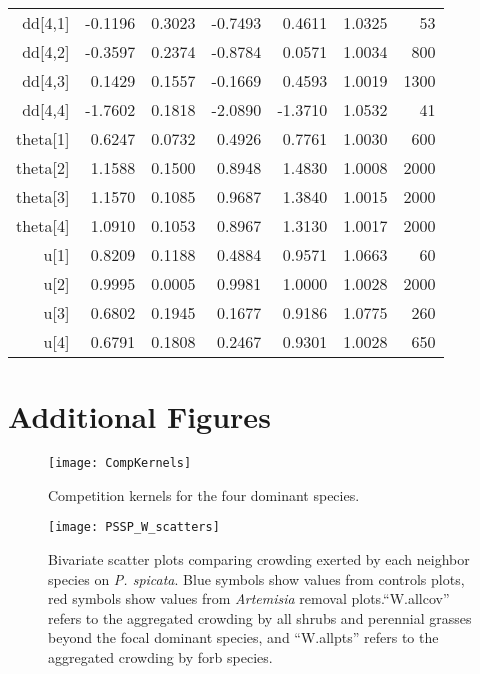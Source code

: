 \documentclass[11pt]{article}
\begin{document}
\begin{table}[ht]
\begin{tabular}{rrrrrrr}
  dd[4,1] & -0.1196 & 0.3023 & -0.7493 & 0.4611 & 1.0325 &    53 \\ 
  dd[4,2] & -0.3597 & 0.2374 & -0.8784 & 0.0571 & 1.0034 &   800 \\ 
  dd[4,3] & 0.1429 & 0.1557 & -0.1669 & 0.4593 & 1.0019 &  1300 \\ 
  dd[4,4] & -1.7602 & 0.1818 & -2.0890 & -1.3710 & 1.0532 &    41 \\ 
  theta[1] & 0.6247 & 0.0732 & 0.4926 & 0.7761 & 1.0030 &   600 \\ 
  theta[2] & 1.1588 & 0.1500 & 0.8948 & 1.4830 & 1.0008 &  2000 \\ 
  theta[3] & 1.1570 & 0.1085 & 0.9687 & 1.3840 & 1.0015 &  2000 \\ 
  theta[4] & 1.0910 & 0.1053 & 0.8967 & 1.3130 & 1.0017 &  2000 \\ 
  u[1] & 0.8209 & 0.1188 & 0.4884 & 0.9571 & 1.0663 &    60 \\ 
  u[2] & 0.9995 & 0.0005 & 0.9981 & 1.0000 & 1.0028 &  2000 \\ 
  u[3] & 0.6802 & 0.1945 & 0.1677 & 0.9186 & 1.0775 &   260 \\ 
  u[4] & 0.6791 & 0.1808 & 0.2467 & 0.9301 & 1.0028 &   650 \\ 
   \hline
\end{tabular}
\end{table}


\clearpage

\section{Additional Figures} 

 \begin{figure}[h]
 \centering
 \texttt{[image: CompKernels]}
 \caption{Competition kernels for the four dominant species.  }
 \label{fig:CompKernels}
 \end{figure}
 
  \begin{figure}[tbp]
  \centering
  \texttt{[image: PSSP\_W\_scatters]}
  \caption{Bivariate scatter plots comparing crowding exerted by each neighbor species on \textit{P. spicata}. Blue symbols show values from controls plots, red symbols show values from \textit{Artemisia} removal plots.``W.allcov'' refers to the aggregated crowding by all shrubs and perennial grasses beyond the focal dominant species, and ``W.allpts'' refers to the aggregated crowding by forb species.  }
  \label{fig:Wscatters}
  \end{figure}
  
\end{document}
